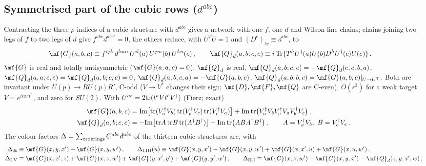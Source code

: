 {\subsection{Symmetrised part of the cubic rows ($d^{abc}$)}\label{sec:s-dabc}
 Contracting the three $\rho$ indices of a cubic structure with $d^{abc}$ gives a network with one $f$, one $d$ and Wilson-line chains; chains joining two legs of $f$ to two legs of $d$ give $f^{abe}d^{abe'}=0$, the others reduce, with $U^{T}U=1$ and $(D^{e})_{bc}\equiv d^{ebc}$, to
\begin{align}
\mf{G}(a,b,c)&\equiv f^{ijk}\,d^{lmn}\,U^{il}(a)\,U^{jm}(b)\,U^{kn}(c)\,,\qquad
\mf{Q}_{d}(a,b;c,e)\equiv i\,{\rm Tr}\{T^{h}U^{\dagger}(a)U(b)D^{h}U^{\dagger}(c)U(e)\}\,.\label{eq:s-GQ}
\end{align}
$\mf{G}$ is real and totally antisymmetric ($\mf{G}(a,a,c)=0$); $\mf{Q}_{d}$ is real, $\mf{Q}_{d}(a,b;c,e)=-\mf{Q}_{d}(e,c;b,a)$, $\mf{Q}_{d}(a,a;c,e)=\mf{Q}_{d}(a,b;c,c)=0$, $\mf{Q}_{d}(a,b;c,a)=-\mf{G}(a,b,c)$, $\mf{Q}_{d}(a,b;b,c)=\mf{G}(a,b,c)|_{U\to U^{T}}$. Both are invariant under $U(p)\to RU(p)R'$, C-odd ($V\to V^{*}$ changes their sign; $\mf{D},\mf{F},\mf{Q}$ are C-even), $O(\epsilon^{3})$ for a weak target $V=e^{i\epsilon\alpha^{a}t^{a}}$, and zero for $SU(2)$. With $U^{ab}=2{\rm tr}(t^{a}Vt^{b}V^{\dagger})$ (Fierz; exact)
\begin{align}
\mf{G}(a,b,c)&={\rm Im}\big[{\rm tr}(V_{a}^{\dagger}V_{b})\,{\rm tr}(V_{b}^{\dagger}V_{c})\,{\rm tr}(V_{c}^{\dagger}V_{a})\big]+{\rm Im}\,{\rm tr}\big(V_{a}^{\dagger}V_{b}V_{c}^{\dagger}V_{a}V_{b}^{\dagger}V_{c}\big)\,,\notag\\
\mf{Q}_{d}(a,b;c,e)&=-{\rm Im}\big[{\rm tr}A\,{\rm tr}B\,{\rm tr}(A^{\dagger}B^{\dagger})\big]-{\rm Im}\,{\rm tr}\big(ABA^{\dagger}B^{\dagger}\big)\,,\qquad A=V_{a}^{\dagger}V_{b},\ B=V_{c}^{\dagger}V_{e}\,.\label{eq:s-Gfund}
\end{align}
The colour factors $\Delta=\sum_{\rm orderings}C^{abc}d^{abc}$ of the thirteen cubic structures are, with
\begin{align}
\Delta_{2b}&\equiv\mf{G}(x,y,x')-\mf{G}(x,y,w')\,,\qquad
\Delta_{\rm I.III}(u)\equiv\mf{G}(x,y,x')-\mf{G}(x,y,w')+\mf{G}(x,x',u)+\mf{G}(x,u,w')\,,\notag\\
\Delta_{\rm I.V}&\equiv\mf{G}(x,x',z)+\mf{G}(x,z,w')+\mf{G}(y,x',y')+\mf{G}(y,y',w')\,,\qquad
\Delta_{\rm II.I}\equiv\mf{G}(x,z,w')-\mf{G}(x,y,x')-\mf{Q}_{d}(z,y;x',w)\,,\notag\\

\end{align}}
